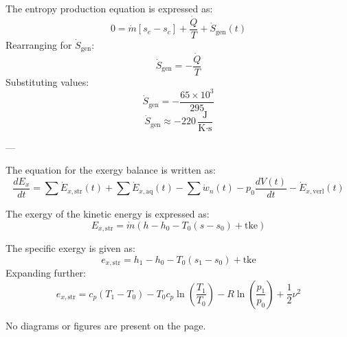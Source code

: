 The entropy production equation is expressed as:  
\[
0 = \dot{m} \left[ s_e - s_c \right] + \frac{\dot{Q}}{T} + \dot{S}_{\text{gen}}(t)
\]  
Rearranging for \( \dot{S}_{\text{gen}} \):  
\[
\dot{S}_{\text{gen}} = -\frac{\dot{Q}}{T}
\]  
Substituting values:  
\[
\dot{S}_{\text{gen}} = -\frac{65 \times 10^3}{295}
\]  
\[
\dot{S}_{\text{gen}} \approx -220 \, \frac{\text{J}}{\text{K·s}}
\]  

---

The equation for the exergy balance is written as:  
\[
\frac{dE_x}{dt} = \sum \dot{E}_{x,\text{str}}(t) + \sum \dot{E}_{x,\text{aq}}(t) - \sum \dot{w}_n(t) - p_0 \frac{dV(t)}{dt} - \dot{E}_{x,\text{verl}}(t)
\]  

The exergy of the kinetic energy is expressed as:  
\[
E_{x,\text{str}} = \dot{m} \left( h - h_0 - T_0 (s - s_0) + \text{tke} \right)
\]  

The specific exergy is given as:  
\[
e_{x,\text{str}} = h_1 - h_0 - T_0 (s_1 - s_0) + \text{tke}
\]  
Expanding further:  
\[
e_{x,\text{str}} = c_p (T_1 - T_0) - T_0 c_p \ln \left( \frac{T_1}{T_0} \right) - R \ln \left( \frac{p_1}{p_0} \right) + \frac{1}{2} \nu^2
\]  

No diagrams or figures are present on the page.
